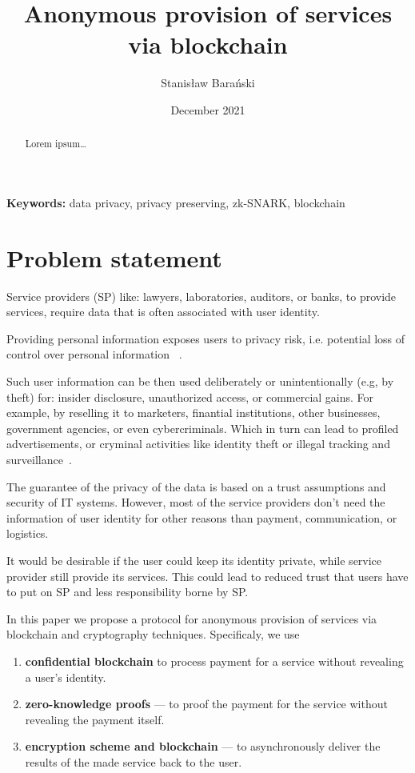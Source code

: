 \documentclass{article}
\title{Anonymous provision of services via blockchain}
\author{Stanisław Barański}
\date{December 2021}
\providecommand{\keywords}[1]{\textbf{Keywords:} #1}
\begin{document}
\maketitle

\begin{abstract}
Lorem ipsum\ldots
\end{abstract}
\keywords{data privacy, privacy preserving, zk-SNARK, blockchain}



\section{Problem statement}
Service providers (SP) like: lawyers, laboratories, auditors, or banks, to provide services, require data that is often associated with user identity.

Providing personal information exposes users to privacy risk, i.e. potential loss of control over personal information ~\cite{smith2011information}. 

Such user information can be then used deliberately or unintentionally (e.g, by theft) for: insider disclosure, unauthorized access, or commercial gains. For example, by reselling it to marketers, finantial institutions, other businesses, government agencies, or even cybercriminals. Which in turn can lead to profiled advertisements, or cryminal activities like identity theft or illegal tracking and surveillance~\cite{smith2011information}.

The guarantee of the privacy of the data is based on a trust assumptions and security of IT systems. However, most of the service providers don't need the information of user identity for other reasons than payment, communication, or logistics. 

It would be desirable if the user could keep its identity private, while service provider still provide its services. This could lead to reduced trust that users have to put on SP and less responsibility borne by SP.

In this paper we propose a protocol for anonymous provision of services via blockchain and cryptography techniques. Specificaly, we use
\begin{enumerate}
    \item \textbf{confidential blockchain} to process payment for a service without revealing a user's identity.
    \item \textbf{zero-knowledge proofs} — to proof the payment for the service without revealing the payment itself.
    \item \textbf{encryption scheme and blockchain} — to asynchronously deliver the results of the made service back to the user.
\end{enumerate}
\end{document}

